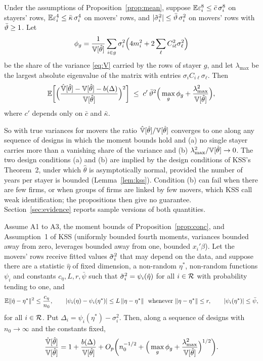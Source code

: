 \begin{proposition}[Convergence]\label{prop:conc}
Under the assumptions of Proposition~\ref{prop:mean}, suppose $\mathbb{E}\varepsilon_i^8\le\bar c\,\sigma_i^8$ on
stayers' rows, $\mathbb{E}\varepsilon_i^4\le\bar\kappa\,\sigma_i^4$ on movers' rows, and
$|\tilde\sigma_i^2|\le\bar\vartheta\,\sigma_i^2$ on movers' rows with $\bar\vartheta\ge1$. Let
\[
\phi_g=\frac{1}{\mathbb{V}[\hat\theta]}\sum_{i\in g}\sigma_i^2\Big(4m_i^2+2\sum_\ell C_{i\ell}^2\sigma_\ell^2\Big)
\]
be the share of the variance \eqref{eq:V} carried by the rows of stayer $g$, and let $\lambda_{\max}$ be the
largest absolute eigenvalue of the matrix with entries $\sigma_iC_{i\ell}\sigma_\ell$. Then
\[
\mathbb{E}\bigg[\Big(\frac{\hat{\mathbb{V}}[\hat\theta]-\mathbb{V}[\hat\theta]-b(\Delta)}{\mathbb{V}[\hat\theta]}\Big)^{2}\bigg]\;\le\;
c'\,\bar\vartheta^2\Big(\max_g\phi_g+\frac{\lambda_{\max}^2}{\mathbb{V}[\hat\theta]}\Big),
\]
where $c'$ depends only on $\bar c$ and $\bar\kappa$.
\end{proposition}

So with true variances for movers the ratio $\hat{\mathbb{V}}[\hat\theta]/\mathbb{V}[\hat\theta]$ converges to one along any
sequence of designs in which the moment bounds hold and (a) no single stayer carries more than a vanishing
share of the variance and (b) $\lambda_{\max}^2/\mathbb{V}[\hat\theta]\to0$. The two design conditions (a) and (b) are
implied by the design conditions of KSS's Theorem~2, under which $\hat\theta$ is asymptotically normal, provided
the number of years per stayer is bounded (Lemma~\ref{lem:kss}). Condition (b) can fail when there are few
firms, or when groups of firms are linked by few movers, which KSS call weak identification; the propositions
then give no guarantee. Section~\ref{sec:evidence} reports sample versions of both quantities.

\begin{proposition}\label{prop:fitted}
Assume A1 to A3, the moment bounds of Proposition~\ref{prop:conc}, and Assumption~1 of KSS (uniformly bounded
fourth moments, variances bounded away from zero, leverages bounded away from one, bounded $x_i'\beta$). Let
the movers' rows receive fitted values $\tilde\sigma_i^2$ that may depend on the data, and suppose there are a statistic
$\hat\eta$ of fixed dimension, a non-random $\eta^*$, non-random functions $\psi_i$ and constants
$c_\eta,L,r,\bar\psi$ such that $\tilde\sigma_i^2=\psi_i(\hat\eta)$ for all $i\in\mathcal{R}$ with probability tending to one,
and
\[
\mathbb{E}\|\hat\eta-\eta^*\|^2\le\frac{c_\eta}{n_0},\qquad
|\psi_i(\eta)-\psi_i(\eta^*)|\le L\,\|\eta-\eta^*\|\ \text{ whenever }\|\eta-\eta^*\|\le r,\qquad
|\psi_i(\eta^*)|\le\bar\psi ,
\]
for all $i\in\mathcal{R}$. Put $\Delta_i=\psi_i(\eta^*)-\sigma_i^2$. Then, along a sequence of designs with
$n_0\to\infty$ and the constants fixed,
\[
\frac{\hat{\mathbb{V}}[\hat\theta]}{\mathbb{V}[\hat\theta]}=1+\frac{b(\Delta)}{\mathbb{V}[\hat\theta]}+O_p\bigg(n_0^{-1/2}+
\Big(\max_g\phi_g+\frac{\lambda_{\max}^2}{\mathbb{V}[\hat\theta]}\Big)^{1/2}\bigg).
\]
\end{proposition}


